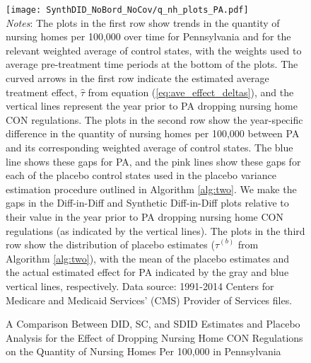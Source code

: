 \documentclass[../Main.tex]{subfiles}
\begin{document}
\newpage
{}
\begin{figure}[t] 
    \setlength{}
	\caption{\label{fig:q_nh_plots_pa} \centering A Comparison Between DID, SC, and SDID Estimates and Placebo Analysis for the Effect of Dropping Nursing Home CON Regulations on the Quantity of Nursing Homes Per 100,000 in Pennsylvania} {\centering\texttt{[image: SynthDID\_NoBord\_NoCov/q\_nh\_plots\_PA.pdf]}}
    \vspace{-1.4cm}\\
    \scriptsize
		\textit{Notes}: The plots in the first row show trends in the quantity of nursing homes per 100,000 over time for Pennsylvania and for the relevant weighted average of control states, with the weights used to average pre-treatment time periods at the bottom of the plots. The curved arrows in the first row indicate the estimated average treatment effect, $\hat{\tau}$ from equation (\ref{eq:ave_effect_deltas}), and the vertical lines represent the year prior to PA dropping nursing home CON regulations. The plots in the second row show the year-specific difference in the quantity of nursing homes per 100,000 between PA and its corresponding weighted average of control states. The blue line shows these gaps for PA, and the pink lines show these gaps for each of the placebo control states used in the placebo variance estimation procedure outlined in Algorithm \ref{alg:two}. We make the gaps in the Diff-in-Diff and Synthetic Diff-in-Diff plots relative to their value in the year prior to PA dropping nursing home CON regulations (as indicated by the vertical lines). The plots in the third row show the distribution of placebo estimates ($\hat{\tau}^{(b)}$ from Algorithm \ref{alg:two}), with the mean of the placebo estimates and the actual estimated effect for PA indicated by the gray and blue vertical lines, respectively. Data source: 1991-2014 Centers for Medicare and Medicaid Services’ (CMS) Provider of Services files.
\end{figure}
\restoregeometry
\clearpage
\end{document}
